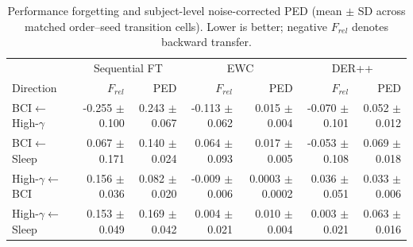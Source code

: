 \begin{table}[t]
\centering
\caption{Performance forgetting and subject-level noise-corrected PED (mean $\pm$ SD across matched order--seed transition cells). Lower is better; negative $F_{rel}$ denotes backward transfer.}
\label{tab:main}
\setlength{\tabcolsep}{3.2pt}
\begin{tabular}{lrrrrrr}
\toprule
& \multicolumn{2}{c}{Sequential FT} & \multicolumn{2}{c}{EWC} & \multicolumn{2}{c}{DER++} \\
Direction & $F_{rel}$ & PED & $F_{rel}$ & PED & $F_{rel}$ & PED \\
\midrule
BCI$\leftarrow$High-$\gamma$ & -0.255 $\pm$ 0.100 & 0.243 $\pm$ 0.067 & -0.113 $\pm$ 0.062 & 0.015 $\pm$ 0.004 & -0.070 $\pm$ 0.101 & 0.052 $\pm$ 0.012 \\
BCI$\leftarrow$Sleep & 0.067 $\pm$ 0.171 & 0.140 $\pm$ 0.024 & 0.064 $\pm$ 0.093 & 0.017 $\pm$ 0.005 & -0.053 $\pm$ 0.108 & 0.069 $\pm$ 0.018 \\
High-$\gamma$$\leftarrow$BCI & 0.156 $\pm$ 0.036 & 0.082 $\pm$ 0.020 & -0.009 $\pm$ 0.006 & 0.0003 $\pm$ 0.0002 & 0.036 $\pm$ 0.051 & 0.033 $\pm$ 0.006 \\
High-$\gamma$$\leftarrow$Sleep & 0.153 $\pm$ 0.049 & 0.169 $\pm$ 0.042 & 0.004 $\pm$ 0.021 & 0.010 $\pm$ 0.004 & 0.003 $\pm$ 0.021 & 0.063 $\pm$ 0.016 \\
\bottomrule
\end{tabular}
\end{table}
